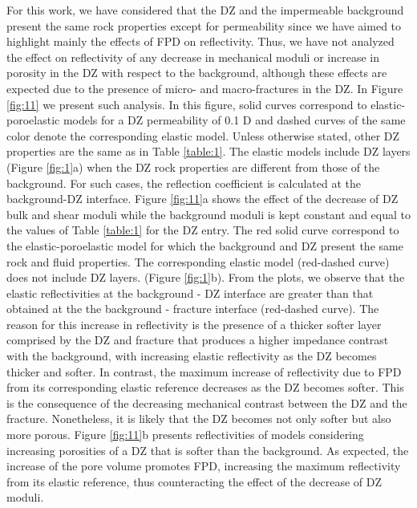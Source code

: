 \documentclass[draft]{agujournal2019}
\begin{document}

For this work, we  have considered that the DZ and the impermeable background present the same rock properties except for permeability since we  have aimed to highlight mainly the effects of FPD on reflectivity.
Thus, we have not analyzed the effect on reflectivity of any  decrease in mechanical moduli  or increase in porosity in the DZ with respect to the background, although these effects are expected due to the presence of micro- and macro-fractures in the DZ. In Figure \ref{fig:11} we present such analysis. In this figure, solid curves correspond to elastic-poroelastic models for a DZ permeability of 0.1 D and dashed curves of the same color denote the corresponding elastic model. Unless otherwise stated, other DZ properties are the same as in Table \ref{table:1}.
The elastic models include DZ layers (Figure \ref{fig:1}a)
when the DZ rock properties are different from those of the background. For such cases, the reflection coefficient is calculated at the background-DZ interface.
Figure \ref{fig:11}a shows the effect of the decrease of DZ bulk and shear moduli while the background moduli is kept constant and equal to the values of Table \ref{table:1} for the DZ entry. The red solid curve correspond to the elastic-poroelastic model for which the background and DZ present the same rock and fluid properties. The corresponding elastic model (red-dashed curve) does not include DZ layers. (Figure \ref{fig:1}b).
From the plots, we observe that the elastic reflectivities at the background - DZ interface are greater than that obtained at the the background - fracture interface (red-dashed curve). The reason for this increase in reflectivity is the presence of a thicker softer layer comprised by the DZ and fracture that produces a higher impedance contrast with the background, with increasing elastic reflectivity as the DZ becomes thicker and softer. In contrast,  the maximum increase of reflectivity due to FPD from its corresponding elastic reference decreases as the DZ becomes softer. This is the consequence of the decreasing mechanical contrast between the DZ and the fracture. Nonetheless, it is likely that the DZ becomes not only softer but also more porous. Figure \ref{fig:11}b presents reflectivities of models considering  increasing porosities of a DZ that is softer than the background. As expected, the increase of the pore volume promotes FPD, increasing the maximum reflectivity from its elastic reference, thus counteracting the effect of the decrease of DZ moduli.
\end{document}
